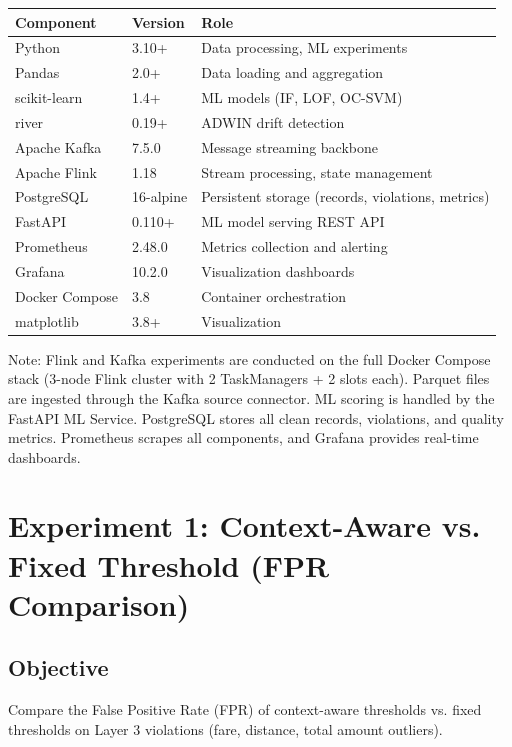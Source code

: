 \begin{longtable}{|m{3.5cm}|m{4.5cm}|m{5cm}|}
\hline
\textbf{Component} & \textbf{Version} & \textbf{Role} \\ \hline
Python & 3.10+ & Data processing, ML experiments \\ \hline
Pandas & 2.0+ & Data loading and aggregation \\ \hline
scikit-learn & 1.4+ & ML models (IF, LOF, OC-SVM) \\ \hline
river & 0.19+ & ADWIN drift detection \\ \hline
Apache Kafka & 7.5.0 & Message streaming backbone \\ \hline
Apache Flink & 1.18 & Stream processing, state management \\ \hline
PostgreSQL & 16-alpine & Persistent storage (records, violations, metrics) \\ \hline
FastAPI & 0.110+ & ML model serving REST API \\ \hline
Prometheus & 2.48.0 & Metrics collection and alerting \\ \hline
Grafana & 10.2.0 & Visualization dashboards \\ \hline
Docker Compose & 3.8 & Container orchestration \\ \hline
matplotlib & 3.8+ & Visualization \\ \hline
\end{longtable}

Note: Flink and Kafka experiments are conducted on the full Docker Compose stack (3-node Flink cluster with 2 TaskManagers + 2 slots each). Parquet files are ingested through the Kafka source connector. ML scoring is handled by the FastAPI ML Service. PostgreSQL stores all clean records, violations, and quality metrics. Prometheus scrapes all components, and Grafana provides real-time dashboards.

\section{Experiment 1: Context-Aware vs. Fixed Threshold (FPR Comparison)}

\subsection{Objective}

Compare the False Positive Rate (FPR) of context-aware thresholds vs. fixed thresholds on Layer 3 violations (fare, distance, total amount outliers).

